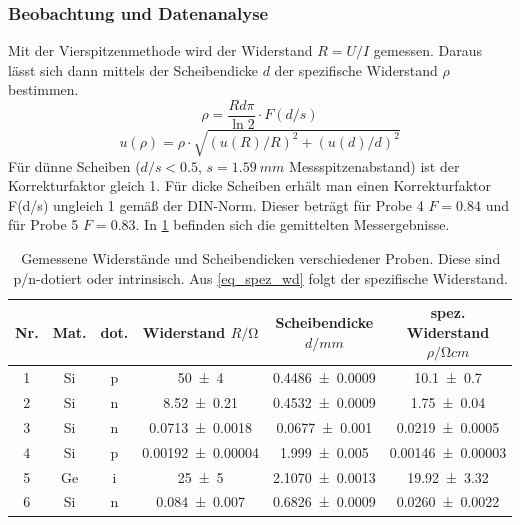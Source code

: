 \documentclass[
	a4paper,
	12pt,
	pagesize,
	ngerman
]{scrartcl}
\begin{document}
	\subsubsection{Beobachtung und Datenanalyse}

	Mit der Vierspitzenmethode wird der Widerstand $R=U/I$ gemessen.
	Daraus lässt sich dann mittels der Scheibendicke $d$ der spezifische Widerstand $\rho$ bestimmen.
	\begin{equation}
			\rho = \frac{R d \pi}{\ln 2} \cdot F(d/s)
			\label{eq_spez_wd}
	\end{equation}
	\begin{equation}
			u(\rho) = \rho\cdot\sqrt{(u(R)/R)^2 + (u(d)/d)^2}
	\end{equation}
	Für dünne Scheiben ($d/s<0.5$, $s=\SI{1.59}{mm}$ Messspitzenabstand) ist der Korrekturfaktor gleich 1.
	Für dicke Scheiben erhält man einen Korrekturfaktor F(d/s) ungleich 1 gemäß der DIN-Norm\cite{DIN50431}.
	Dieser beträgt für Probe 4 $F=0.84$ und für Probe 5 $F=0.83$.
	In \cref{tb_spez_wd} befinden sich die gemittelten Messergebnisse.

	\begin{table}[H]
		\centering
		\begin{tabular}{c | c | c | c | c | c  }
			 Nr.& Mat. & dot. & Widerstand $R/\si{\ohm}$& Scheibendicke $d/\si{mm}$ & spez. Widerstand $\rho/\si{\ohm cm}$ \\ \hline %
			 1& Si& p& \SI{50+-4}{}&\SI{0.4486+-0.0009}{}& \SI{10.1+-0.7}{} \\
			 2& Si& n&\SI{8.52+-0.21}{}&\SI{0.4532+-0.0009}{}&\SI{1.75+-0.04}{} \\
			 3& Si& n&\SI{0.0713+-0.0018}{}&\SI{0.0677+-0.001}{}&\SI{0.0219+-0.0005}{} \\
			 4& Si& p&\SI{0.00192+-0.00004}{}&\SI{1.999+-0.005}{}&\SI{0.00146+-0.00003}{} \\ %
			 5& Ge& i&\SI{25+-5}{}&\SI{2.1070+-0.0013}{}&\SI{19.92+-3.32}{}  \\ %
			 6& Si& n&\SI{0.084+-0.007}{}&\SI{0.6826+-0.0009}{}&\SI{0.0260+-0.0022}{} \\
		\end{tabular}
		\caption{
		Gemessene Widerstände und Scheibendicken verschiedener Proben.
		Diese sind p/n-dotiert oder intrinsisch.
		Aus \cref{eq_spez_wd} folgt der spezifische Widerstand.
		}
		\label{tb_spez_wd}
	\end{table}
\end{document}
